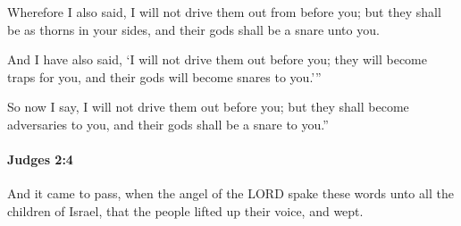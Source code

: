			\begin{versebox}
					\item[BHS] 
					\item[ASV] Wherefore I also said, I will not drive them out from before you; but they shall be as thorns in your sides, and their gods shall be a snare unto you.
					\item[NIV] And I have also said, ‘I will not drive them out before you; they will become traps for you, and their gods will become snares to you.’”
					\item[NRSV] So now I say, I will not drive them out before you; but they shall become adversaries to you, and their gods shall be a snare to you.”
			\end{versebox}

		\paragraph{Judges 2:4} %
			\label{JUDGES-2-4}

			And it came to pass, when the angel of the LORD spake these words unto all the children of Israel, that the people lifted up their voice, and wept.

